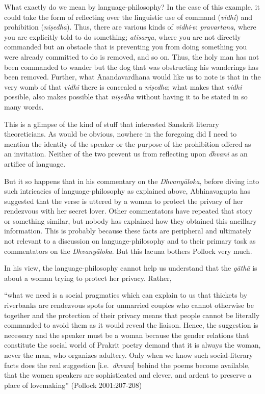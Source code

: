 What exactly do we mean by language-philosophy? In the case of this example, it could take the form of reflecting over the linguistic use of command (\textsl{vidhi}) and prohibition (\textsl{niṣedha}). Thus, there are various kinds of \textsl{vidhi}-s: \textsl{pravartana}, where you are explicitly told to do something; \textsl{atisarga}, where you are not directly commanded but an obstacle that is preventing you from doing something you were already committed to do is removed, and so on. Thus, the holy man has not been commanded to wander but the dog that was obstructing his wanderings has been removed. Further, what Ānandavardhana would like us to note is that in the very womb of that \textsl{vidhi} there is concealed a \textsl{niṣedha}; what makes that \textsl{vidhi} possible, also makes possible that \textsl{niṣedha} without having it to be stated in so many words.

This is a glimpse of the kind of stuff that interested Sanskrit literary theoreticians. As would be obvious, nowhere in the foregoing did I need to mention the identity of the speaker or the purpose of the prohibition offered as an invitation. Neither of the two prevent us from reflecting upon \textsl{dhvani} as an artifice of language. 

But it so happens that in his commentary on the \textsl{Dhvanyāloka}, before diving into such intricacies of language-philosophy as explained above, Abhinavagupta has suggested that the verse is uttered by a woman to protect the privacy of her rendezvous with her secret lover. Other commentators have repeated that story or something similar, but nobody has explained how they obtained this ancillary information. This is probably because these facts are peripheral and ultimately not relevant to a discussion on language-philosophy and to their primary task as commentators on the \textsl{Dhvanyāloka}. But this lacuna bothers Pollock very much.

In his view, the language-philosophy cannot help us understand that the \textsl{gāthā} is about a woman trying to protect her privacy. Rather, 


\begin{myquote}
``what we need is a social pragmatics which can explain to us that thickets by riverbanks are rendezvous spots for unmarried couples who cannot otherwise be together and the protection of their privacy means that people cannot be literally commanded to avoid them as it would reveal the liaison. Hence, the suggestion is necessary and the speaker must be a woman because the gender relations that constitute the social world of Prakrit poetry demand that it is always the woman, never the man, who organizes adultery. Only when we know such social-literary facts does the real suggestion [i.e.\ \textsl{dhvani}] behind the poems become available, that the women speakers are sophisticated and clever, and ardent to preserve a place of lovemaking''
\hfill (Pollock 2001:207-208)
\end{myquote}

